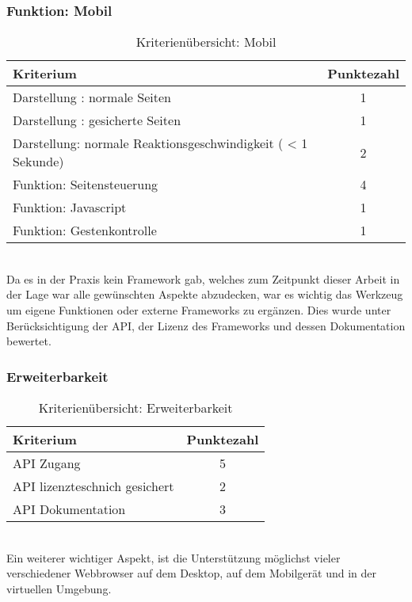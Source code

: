 \subsubsection{Funktion: Mobil}
\begin{table}[H]
 	\vspace{-30pt}
 	\centering
		\begin{tabular}{| p{12cm} | c|}
			\hline
				Kriterium		 &	Punktezahl\\
			\hline
			\hline
				Darstellung : normale Seiten			&1\\
				Darstellung : \Gls{gesichert}e Seiten		&	1	\\
				 Darstellung: normale Reaktionsgeschwindigkeit ( < 1 Sekunde)	&	2	\\
				Funktion: Seitensteuerung			&	4	\\
				Funktion: \Gls{Javascript}			&	1	\\
				Funktion: Gestenkontrolle			&	1	\\
				\hline
		\end{tabular}
	\caption{Kriterienübersicht: Mobil}
\end{table}

\\Da es in der Praxis kein \Gls{Framework} gab, welches zum Zeitpunkt dieser Arbeit in der Lage war alle gewünschten Aspekte abzudecken, war es wichtig das Werkzeug um eigene Funktionen oder externe \Gls{Framework}s zu ergänzen. Dies wurde unter Berücksichtigung der API, der Lizenz des \Gls{Framework}s und dessen Dokumentation bewertet.
\subsubsection{Erweiterbarkeit}
\begin{table}[H]
 	\vspace{-30pt}
 	\centering
		\begin{tabular}{| p{12cm} | c|}
			\hline
				Kriterium		 &	Punktezahl\\
			\hline
			\hline
				API Zugang			&5\\
				API lizenzteschnich gesichert	&	2	\\
				API Dokumentation	&	3	\\
				\hline
		\end{tabular}
	\caption{Kriterienübersicht: Erweiterbarkeit}
\end{table}

\\Ein weiterer wichtiger Aspekt, ist die Unterstützung möglichst vieler verschiedener \Gls{Webbrowser} auf dem Desktop, auf dem Mobilgerät und in der virtuellen Umgebung.

